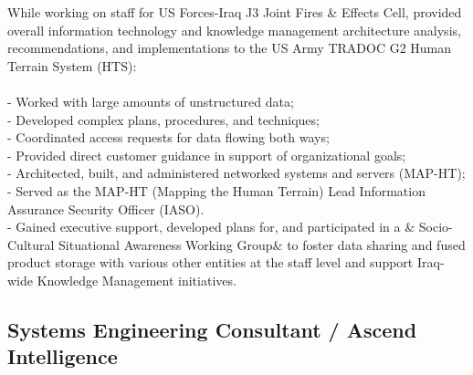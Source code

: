 \documentclass{article}
\begin{document}
{\noindent}While working on staff for US Forces-Iraq J3 Joint Fires \& Effects Cell, provided overall information technology and knowledge management architecture analysis, recommendations, and implementations to the US Army TRADOC G2 Human Terrain System (HTS):\\\\- Worked with large amounts of unstructured data;\\- Developed complex plans, procedures, and techniques;\\- Coordinated access requests for data flowing both ways;\\- Provided direct customer guidance in support of organizational goals;\\- Architected, built, and administered networked systems and servers (MAP-HT);\\- Served as the MAP-HT (Mapping the Human Terrain) Lead Information Assurance Security Officer (IASO).\\- Gained executive support, developed plans for, and participated in a & Socio-Cultural Situational Awareness Working Group&  to foster data sharing and fused product storage with various other entities at the staff level and support Iraq-wide Knowledge Management initiatives.
\\\subsection { Systems Engineering Consultant / Ascend Intelligence }
\end{document}
